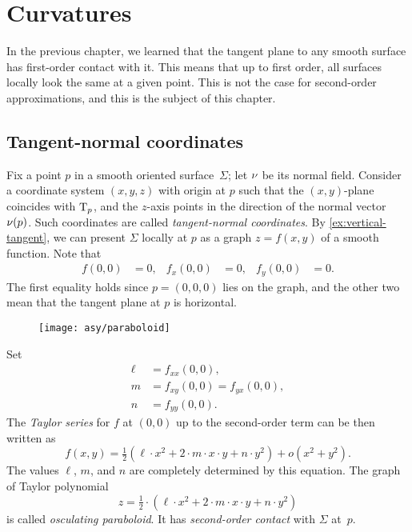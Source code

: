 \chapter{Curvatures}
\label{chap:surface-curvature}

In the previous chapter, we learned that the tangent plane to any smooth surface has first-order contact with it.
This means that up to first order, all surfaces locally look the same at a given point.
This is not the case for second-order approximations, and this is the subject of this chapter.

\section{Tangent-normal coordinates} \label{sec:lmn}

Fix a point $p$ in a smooth oriented surface~$\Sigma$;
let $\nu$ be its normal field.
Consider a coordinate system $(x,y,z)$ with origin at $p$ such that the $(x,y)$-plane coincides with $\mathrm{T}_p$, and the $z$-axis points in the direction of the normal vector $\nu(p)$. Such coordinates are called \emph{tangent-normal coordinates}. 
By \ref{ex:vertical-tangent}, we can present $\Sigma$ locally at $p$ as a graph $z=f(x,y)$ of a smooth function. 
Note that 
\begin{align*}
f(0,0)&=0,
&
f_x(0,0)&=0,
&
f_y(0,0)&=0.
\end{align*}
The first equality holds since $p=(0,0,0)$ lies on the graph, and the other two mean that the tangent plane at $p$ is horizontal.


\begin{wrapfigure}[7]{o}{42 mm}
\vskip-4mm
\centering
\texttt{[image: asy/paraboloid]}
\vskip-3mm
\end{wrapfigure}

Set 
\begin{align*}
\ell&=f_{xx}(0,0),
\\
m&=f_{xy}(0,0)=f_{yx}(0,0),
\\
n&=f_{yy}(0,0).
\end{align*}
The \textit{Taylor series} 
for $f$ at $(0,0)$ up to the second-order term can be then written as
\[f(x,y)=\tfrac12(\ell\cdot x^2+2\cdot m\cdot x\cdot y+n\cdot y^2)+o(x^2+y^2).\]
The values $\ell$, $m$, and $n$ are completely determined by this equation.
The graph of Taylor polynomial
\[z=\tfrac12\cdot(\ell\cdot x^2+2\cdot m\cdot x\cdot y+n\cdot y^2)\]
is called \emph{osculating paraboloid}.
It has \emph{second-order contact} with $\Sigma$ at~$p$.

